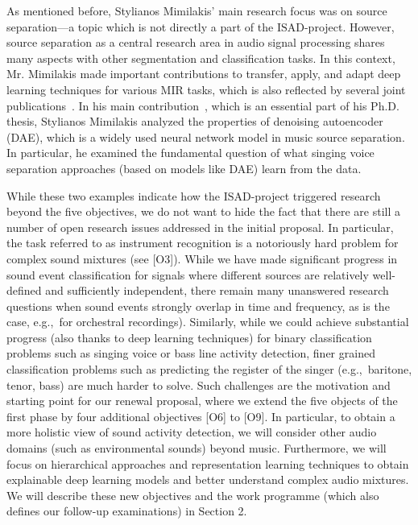 \documentclass[11pt,a4paper]{article}
\def\PN{\mathrm{ISAD}}
\newcommand{\egc}{e.g.,\ }
\theoremstyle{plain} \newtheorem{define}{Definition}[section]
\begin{document}
{As mentioned before, Stylianos Mimilakis' main research focus was on source separation---a topic which is not directly a part of the $\PN$-project. However, source separation as a central research area in audio signal processing shares many aspects with other segmentation and classification tasks. In this context, Mr. Mimilakis made important contributions to transfer, apply, and adapt deep learning techniques for various MIR tasks, which is also reflected by several joint publications~\cite{AbesserCTPM21_InstrumentJazz_EUSIPCO,
MimilakisWAAM19_SingingVDetWagner_MML,
TaenzerMA21_LocalPolyphonyEstimation_Electronics}.
%
In his main contribution~\cite{MimilakisDCS19_DenoisingAutoencoders_TASLP}, which is an essential part of his Ph.D. thesis, Stylianos Mimilakis analyzed the properties of denoising autoencoder (DAE), which is a widely used neural network model in music source separation. In particular, he examined the fundamental question of what singing voice separation approaches (based on models like DAE) learn from the data. 

While these two examples indicate how the $\PN$-project triggered research beyond the five objectives, we do not want to hide the fact that there are still a number of open research issues addressed in the initial proposal. In particular, the task referred to as instrument recognition is a notoriously hard problem for complex sound mixtures (see [O3]). While we have made significant progress in sound event classification for signals where different sources are relatively well-defined and sufficiently independent, there remain many unanswered research questions when sound events strongly overlap in time and frequency, as is the case, \egc for orchestral recordings).
%
Similarly, while we could achieve substantial progress (also thanks to deep learning techniques) for binary classification problems such as singing voice or bass line activity detection, finer grained classification problems such as predicting the register of the singer (\egc baritone, tenor, bass) are much harder to solve.
%
Such challenges are the motivation and starting point for our renewal proposal, where we extend the five objects of the first phase by four additional objectives [O6] to [O9]. In particular, to obtain a more holistic view of sound activity detection, we will consider other audio domains (such as environmental sounds) beyond music. Furthermore, we will focus on hierarchical approaches and representation learning techniques to obtain explainable deep learning models and better understand complex audio mixtures. We will describe these new objectives and the work programme (which also defines our follow-up examinations) in Section 2. 


}
\end{document}
